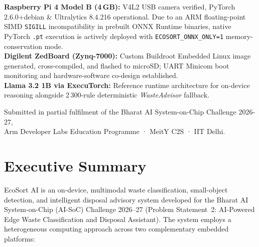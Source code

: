 \documentclass[12pt,a4paper]{article}
\begin{document}
\begin{titlepage}
\begin{tcolorbox}[colback=ecosortgreen!10,colframe=ecosortgreen,
                  fonttitle=\bfseries, title={Implementation \& Hardware Deployment Reality}]
\centering
\textbf{Raspberry Pi 4 Model B (4\,GB):} V4L2 USB camera verified, PyTorch 2.6.0+debian \& Ultralytics 8.4.216 operational. Due to an ARM floating-point SIMD \texttt{SIGILL} incompatibility in prebuilt ONNX Runtime binaries, native PyTorch \texttt{.pt} execution is actively deployed with \texttt{ECOSORT\_ONNX\_ONLY=1} memory-conservation mode.\\[4pt]
\textbf{Digilent ZedBoard (Zynq-7000):} Custom Buildroot Embedded Linux image generated, cross-compiled, and flashed to microSD; UART Minicom boot monitoring and hardware-software co-design established.\\[4pt]
\textbf{Llama 3.2 1B via ExecuTorch:} Reference runtime architecture for on-device reasoning alongside 2\,300-rule deterministic \textit{WasteAdvisor} fallback.
\end{tcolorbox}

\vfill
{\small\color{ecosortgray}
  Submitted in partial fulfilment of the Bharat AI System-on-Chip Challenge 2026-27,\\
  Arm Developer Labs Education Programme · MeitY C2S · IIT Delhi.
}
\end{titlepage}

\tableofcontents
\clearpage

\section*{Executive Summary}

EcoSort AI is an on-device, multimodal waste classification, small-object detection,
and intelligent disposal advisory system developed for the Bharat AI System-on-Chip
(AI-SoC) Challenge 2026--27 (Problem Statement~2: AI-Powered Edge Waste Classification
and Disposal Assistant). The system employs a heterogeneous computing approach across two
complementary embedded platforms:
\end{document}

